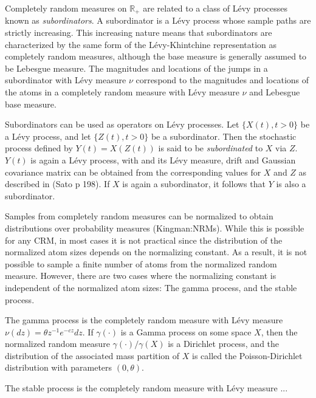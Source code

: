 Completely random measures on $\mathbb{R_+}$ are related to a class of L\'{e}vy processes known as \emph{subordinators}. A subordinator is a L\'{e}vy process whose sample paths are strictly increasing. This increasing nature means that subordinators are characterized by the same form of the L\'{e}vy-Khintchine representation as completely random measures, although the base measure is generally assumed to be Lebesgue measure. The magnitudes and locations of the jumps in a subordinator with L\'{e}vy measure $\nu$ correspond to the magnitudes and locations of the atoms in a completely random measure with L\'{e}vy measure $\nu$ and Lebesgue base measure. 

Subordinators can be used as operators on L\'{e}vy processes.  Let $\{X(t),t>0\}$ be a L\'{e}vy process, and let $\{Z(t),t>0\}$ be a subordinator. Then the stochastic process defined by $Y(t) = X(Z(t))$ is said to be \emph{subordinated} to $X$ via $Z$. $Y(t)$ is again a L\'{e}vy process, with and its L\'{e}vy measure, drift and Gaussian covariance matrix can be obtained from the corresponding values for $X$ and $Z$ as described in (Sato p 198). If $X$ is again a subordinator, it follows that $Y$ is also a subordinator. 

Samples from completely random measures can be normalized to obtain distributions over probability measures (Kingman:NRMs). While this is possible for any CRM, in most cases it is not practical since the distribution of the normalized atom sizes depends on the normalizing constant. As a result, it is not possible to sample a finite number of atoms from the normalized random measure. However, there are two cases where the normalizing constant is independent of the normalized atom sizes: The gamma process, and the stable process.


The gamma process is the completely random measure with L\'{e}vy measure $\nu(dz) = \theta z^{-1}e^{-cz} dz$. If $\gamma(\cdot)$ is a Gamma process on some space $X$, then the normalized random measure $\gamma(\cdot)/\gamma(X)$ is a Dirichlet process, and the distribution of the associated mass partition of $X$ is called the Poisson-Dirichlet distribution with parameters $(0,\theta)$.

The stable process is the completely random measure with L\'{e}vy measure ...
